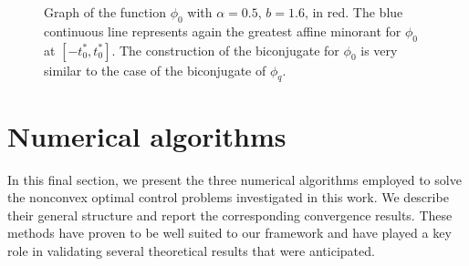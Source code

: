 \begin{figure}[H]
\centering
{}

\caption{Graph of the function $\phi_0$ with $\alpha=0.5$, $b=1.6$, in red. The blue continuous line represents again the greatest affine minorant for $\phi_0$ at $[-t_0^*, t_0^*]$. The construction of the biconjugate for $\phi_0$ is very similar to the case of the biconjugate of $\phi_q$.}
\label{fig:phi_q_zero_case}
\end{figure}


\section{Numerical algorithms}

In this final section, we present the three numerical algorithms employed to solve the nonconvex optimal control problems investigated in this work. We describe their general structure and report the corresponding convergence results. These methods have proven to be well suited to our framework and have played a key role in validating several theoretical results that were anticipated.

